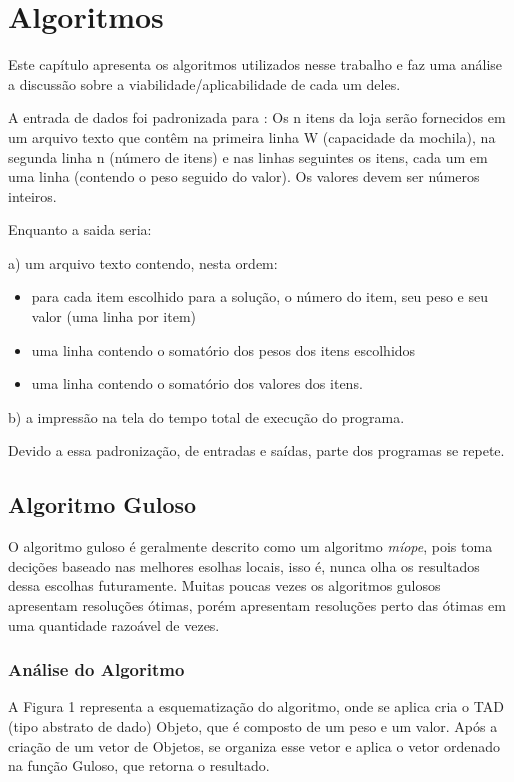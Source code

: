 \chapter[Algoritmos]{Algoritmos}
\label{cap:formato}

Este capítulo apresenta os algoritmos utilizados nesse trabalho e faz uma análise a discussão sobre a viabilidade/aplicabilidade de cada um deles. 

A entrada de dados foi padronizada para : Os n itens da loja serão fornecidos em um arquivo texto que contêm na primeira linha W (capacidade da mochila), na segunda linha n (número de itens) e nas linhas seguintes os itens, cada
um em uma linha (contendo o peso seguido do valor). Os valores devem ser números inteiros.

Enquanto a saida seria: 

a) um arquivo texto contendo, nesta ordem:
\begin{itemize}
\item para cada item escolhido para a solução, o número do item, seu peso e seu valor (uma
linha por item)
\item uma linha contendo o somatório dos pesos dos itens escolhidos
\item  uma linha contendo o somatório dos valores dos itens. 
\end{itemize}
b) a impressão na tela do tempo total de execução do programa.

Devido a essa padronização, de entradas e saídas, parte dos programas se repete.
\section{Algoritmo Guloso}
\label{sec:preTextual}
 O algoritmo guloso é geralmente descrito como um algoritmo \textit{míope}, pois toma decições baseado nas melhores esolhas locais, isso é, nunca olha os resultados dessa escolhas futuramente. Muitas poucas vezes os algoritmos gulosos apresentam resoluções ótimas, porém apresentam resoluções perto das ótimas em uma quantidade razoável de vezes. 
 
\subsection{Análise do Algoritmo}
 A Figura 1 representa a esquematização do algoritmo, onde se aplica cria o TAD (tipo abstrato de dado) Objeto, que é composto de um peso e um valor. Após a criação de um vetor de Objetos, se organiza esse vetor e aplica o vetor ordenado na função Guloso, que retorna o resultado.

